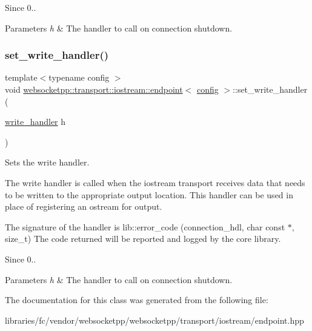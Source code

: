 \begin{DoxySince}{Since}
0..
\end{DoxySince}

\begin{DoxyParams}{Parameters}
{\em h} & The handler to call on connection shutdown. \\
\hline
\end{DoxyParams}
\mbox{\label{classwebsocketpp_1_1transport_1_1iostream_1_1endpoint_a1db266dab8c73f4aa2e8a3bdb95ec5a3}} 
\subsubsection{\texorpdfstring{set\+\_\+write\+\_\+handler()}{set\_write\_handler()}}
{\footnotesize\ttfamily template$<$typename config $>$ \\
void \mbox{\hyperlink{classwebsocketpp_1_1transport_1_1iostream_1_1endpoint}{websocketpp\+::transport\+::iostream\+::endpoint}}$<$ \mbox{\hyperlink{classconfig}{config}} $>$\+::set\+\_\+write\+\_\+handler (\begin{DoxyParamCaption}\item[{\mbox{\hyperlink{namespacewebsocketpp_1_1transport_1_1iostream_abc22b834c2d0c698d6c87e51d5bfad2c}{write\+\_\+handler}}}]{h }\end{DoxyParamCaption})\hspace{0.3cm}{\ttfamily [inline]}}



Sets the write handler. 

The write handler is called when the iostream transport receives data that needs to be written to the appropriate output location. This handler can be used in place of registering an ostream for output.

The signature of the handler is {\ttfamily lib\+::error\+\_\+code (connection\+\_\+hdl, char const $\ast$, size\+\_\+t)} The code returned will be reported and logged by the core library.

\begin{DoxySince}{Since}
0..
\end{DoxySince}

\begin{DoxyParams}{Parameters}
{\em h} & The handler to call on connection shutdown. \\
\hline
\end{DoxyParams}


The documentation for this class was generated from the following file\+:\begin{DoxyCompactItemize}
\item 
libraries/fc/vendor/websocketpp/websocketpp/transport/iostream/endpoint.\+hpp\end{DoxyCompactItemize}
